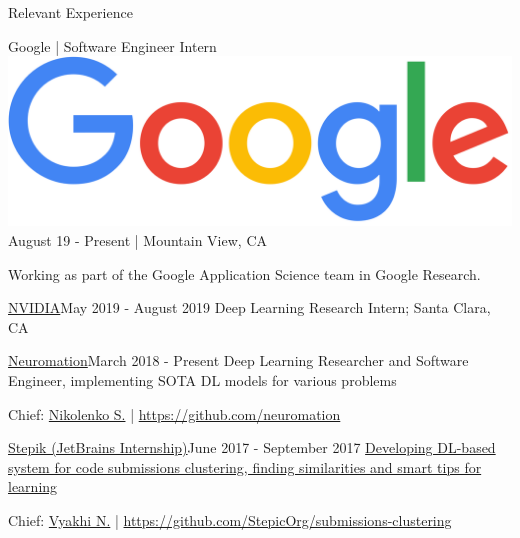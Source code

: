 \documentclass{resume} %
\newcommand{\SKIPSM}{\vspace{-0.7\baselineskip}}
\begin{document}
\SKIPSM
\begin{rSection}{Relevant Experience}

\vspace{-1.3\baselineskip}
\begin{rSubsection}{Google {\scriptsize | Software Engineer Intern}}{\hspace*{-10cm}\includegraphics[scale=0.025]{google.png}}
{August 19 - Present | Mountain View, CA}{}
\item Working as part of the Google Application Science team in Google Research.
\end{rSubsection}

\begin{rSubsection}{\href{https://www.nvidia.com}{NVIDIA}}{May 2019 - August 2019}
{Deep Learning Research Intern; Santa Clara, CA}{}
\item[]
\end{rSubsection}
\vspace{-2.0\baselineskip}

\begin{rSubsection}{\href{https://neuromation.io}{Neuromation}}{March 2018 - Present}
{Deep Learning Researcher and Software Engineer, implementing SOTA DL models for various problems}{} 
\item[] Chief: \href{https://logic.pdmi.ras.ru/~sergey/}{Nikolenko S.} | \url{https://github.com/neuromation}
\end{rSubsection}


\vspace{-0.9\baselineskip}
\begin{rSubsection}{\href{http://stepik.org/}{Stepik (JetBrains Internship)}}{June 2017 - September 2017}
{\href{https://jetbrains.ru/students/internship/themes/again/}{Developing DL-based system for code submissions clustering, finding similarities and smart tips for learning}}{} 
\item[] Chief: \href{http://bioinformaticsinstitute.ru/teachers/vyahhi}{Vyakhi N.} | \url{https://github.com/StepicOrg/submissions-clustering}
\end{rSubsection}

\end{rSection}
\end{document}

